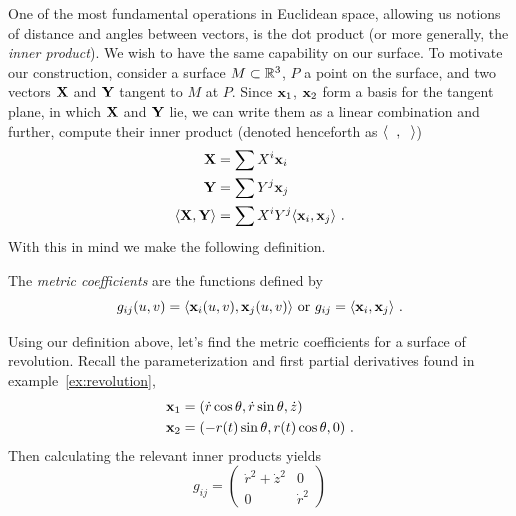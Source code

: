 \begin{unno_rem}
  One of the most fundamental operations in Euclidean space, allowing us notions of distance and angles between vectors, is the dot product (or more generally, the \emph{inner product}). We wish to have the same capability on our surface. To motivate our construction, consider a surface $M \subset \mathbb{R}^3$, $P$ a point on the surface, and two vectors $\mathbf{X}$ and $\mathbf{Y}$ tangent to $M$ at $P$. Since $\mathbf{x}_1$, $\mathbf{x}_2$ form a basis for the tangent plane, in which $\mathbf{X}$ and $\mathbf{Y}$ lie, we can write them as a linear combination and further, compute their inner product (denoted henceforth as $\langle\phantom{x},\phantom{x}\rangle$)
  \begin{align*}
    \mathbf{X} &= \sum X^i\mathbf{x}_i\\
    \mathbf{Y} &= \sum Y^j\mathbf{x}_j\\
    \langle\mathbf{X}, \mathbf{Y}\rangle &= \sum X^iY^j\langle\mathbf{x}_i, \mathbf{x}_j\rangle \ .
  \end{align*}
  With this in mind we make the following definition.
\end{unno_rem}

\begin{defn}
  The \emph{metric coefficients} are the functions defined by
  \[
    g_{ij}(u, v) = \langle\mathbf{x}_i(u, v), \mathbf{x}_j(u, v)\rangle \text{ or } g_{ij} = \langle\mathbf{x}_i, \mathbf{x}_j\rangle \ .
  \]
\end{defn}


\begin{ex}
  Using our definition above, let's find the metric coefficients for a surface of revolution. Recall the parameterization and first partial derivatives found in example~\ref{ex:revolution},
  \begin{align*}
    \mathbf{x}_1 &= (\dot{r}\cos{\theta}, \dot{r}\sin{\theta}, \dot{z})\\
    \mathbf{x}_2 &= (-r(t)\sin{\theta}, r(t)\cos{\theta}, 0) \ .
  \end{align*}
  Then calculating the relevant inner products yields
  \[
    g_{ij} = \left(\begin{array}{cc}
      \dot{r}^2 + \dot{z}^2 & 0\\
      0 & \dot{r}^2
    \end{array}\right)
  \]
\end{ex}

